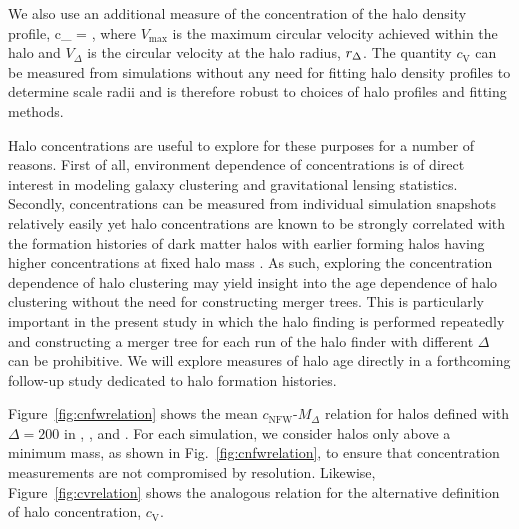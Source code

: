 \documentclass[usenatbib,usegraphicx,letterpaper]{mn2e}
\begin{document}
We also use an additional measure of the concentration of the halo density profile, 
\beq
c_{} = , 
\eeq
where $V_{\mathrm{max}}$ is the maximum circular velocity achieved within the halo and $V_{\Delta}$ is the circular 
velocity at the halo radius, $r_{\Delta}$. The quantity $c_{\mathrm{V}}$ can be measured from simulations without 
any need for fitting halo density profiles to determine scale radii and is therefore robust to choices of halo profiles 
and fitting methods. 

Halo concentrations are useful to explore for these purposes for a number of reasons. First of all, environment dependence 
of concentrations is of direct interest in modeling galaxy clustering and gravitational lensing statistics. Secondly, 
concentrations can be measured 
from individual simulation snapshots relatively easily yet halo concentrations are known to be strongly correlated with the formation 
histories of dark matter halos with earlier forming halos having higher concentrations at fixed halo mass \citep{wechsler02, wechsler06} 
. As such, exploring the concentration dependence of halo clustering may 
yield insight into the age dependence of halo clustering without the need for constructing merger trees. This 
is particularly important in the present study in which the halo finding is performed repeatedly and constructing a 
merger tree for each run of the halo finder with different $\Delta$ can be prohibitive. We will explore measures of 
halo age directly in a forthcoming follow-up study dedicated to halo formation histories.

Figure~\ref{fig:cnfwrelation} shows the mean $c_{\mathrm{NFW}}$-$M_{\Delta}$ relation for halos defined with $\Delta=200$ 
in \simA, \simB, and \simC. For each simulation, we consider halos only above a minimum mass, as shown in Fig.~\ref{fig:cnfwrelation}, to ensure that concentration measurements are not compromised by resolution. Likewise, Figure~\ref{fig:cvrelation} shows the analogous 
relation for the alternative definition of halo concentration, $c_{\mathrm{V}}$. 
\end{document}
